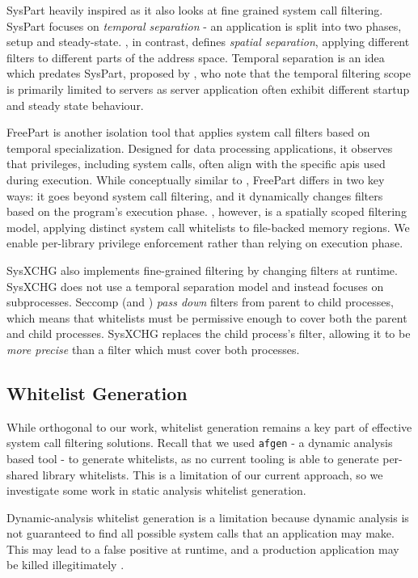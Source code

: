 SysPart \cite{SYSPART} heavily inspired \af as it also
looks at fine grained system call filtering. SysPart focuses on \textit{temporal
separation} - an application is split into two phases, setup and steady-state.
\af, in contrast, defines \textit {spatial separation}, applying different
filters to different parts of the address space. Temporal separation is an
idea which predates SysPart, proposed by \textcite{TEMPORAL_SPEC}, who note that
the temporal filtering scope is primarily limited to servers as server
application often exhibit different startup and steady state behaviour. 

FreePart \cite{ahad2023freepart} is another isolation tool that applies
system call filters based on temporal specialization. Designed for data
processing applications, it observes that privileges, including system calls,
often align with the specific \acp{api} used during execution. While
conceptually similar to \af, FreePart differs in two key ways: it goes
beyond system call filtering, and it dynamically changes filters based on
the program's execution phase. \af, however, is a spatially scoped filtering
model, applying distinct system call whitelists to file-backed memory regions.
We enable per-library privilege enforcement rather than relying on execution 
phase.

SysXCHG \cite{SYSXCHG} also implements fine-grained filtering by changing
filters at runtime. SysXCHG does not use a temporal separation model and instead
focuses on subprocesses. Seccomp (and \af) \textit{pass down} filters from
parent to child processes, which means that whitelists must be permissive enough
to cover both the parent and child processes. SysXCHG replaces the child
process's filter, allowing it to be \textit{more precise} than a filter which
must cover both processes.

\subsection{Whitelist Generation}

While orthogonal to our work, whitelist generation remains a key part of
effective system call filtering solutions. Recall that we used \texttt{afgen} -
a dynamic analysis based tool - to generate \af whitelists, as no current
tooling is able to generate per-shared library whitelists. This is a limitation
of our current approach, so we investigate some work in static analysis
whitelist generation.

Dynamic-analysis whitelist generation is a limitation because dynamic analysis
is not guaranteed to find all possible system calls that an application may
make. This may lead to a false positive at runtime, and a production application
may be killed illegitimately \cite{XING2022105}. 

